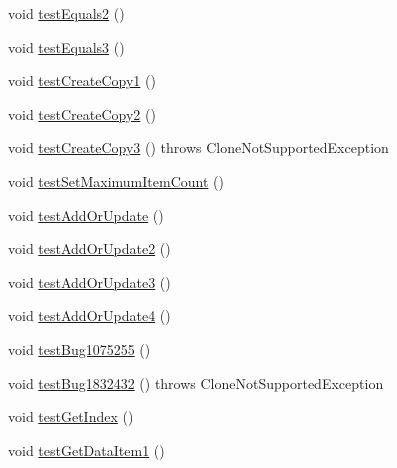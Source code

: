 \begin{DoxyCompactItemize}
\item 
void \mbox{\hyperlink{classorg_1_1jfree_1_1data_1_1time_1_1_time_series_test_a5d8663fc4750d0b53140beab6da7f278}{test\+Equals2}} ()
\item 
void \mbox{\hyperlink{classorg_1_1jfree_1_1data_1_1time_1_1_time_series_test_a5f68bb7f7306731839c2700b5063d85a}{test\+Equals3}} ()
\item 
void \mbox{\hyperlink{classorg_1_1jfree_1_1data_1_1time_1_1_time_series_test_a456b667abc36132f428c31959f532520}{test\+Create\+Copy1}} ()
\item 
void \mbox{\hyperlink{classorg_1_1jfree_1_1data_1_1time_1_1_time_series_test_a39449fadd80fb84600b66980a6824895}{test\+Create\+Copy2}} ()
\item 
void \mbox{\hyperlink{classorg_1_1jfree_1_1data_1_1time_1_1_time_series_test_a842f21aaee9af5b65803a4c9329c9cf7}{test\+Create\+Copy3}} ()  throws Clone\+Not\+Supported\+Exception 
\item 
void \mbox{\hyperlink{classorg_1_1jfree_1_1data_1_1time_1_1_time_series_test_a4a972d98b806952a9d0c8681d1017c29}{test\+Set\+Maximum\+Item\+Count}} ()
\item 
void \mbox{\hyperlink{classorg_1_1jfree_1_1data_1_1time_1_1_time_series_test_ac4f9d9859cf29c2276df2a2e61eea7ff}{test\+Add\+Or\+Update}} ()
\item 
void \mbox{\hyperlink{classorg_1_1jfree_1_1data_1_1time_1_1_time_series_test_a43ec8e21a8c01c4c0cfea8a8bbe55a06}{test\+Add\+Or\+Update2}} ()
\item 
void \mbox{\hyperlink{classorg_1_1jfree_1_1data_1_1time_1_1_time_series_test_a600123557124c6da86477de2b41f5a9e}{test\+Add\+Or\+Update3}} ()
\item 
void \mbox{\hyperlink{classorg_1_1jfree_1_1data_1_1time_1_1_time_series_test_a55a7cb39af7684abe7d04a80899d5217}{test\+Add\+Or\+Update4}} ()
\item 
void \mbox{\hyperlink{classorg_1_1jfree_1_1data_1_1time_1_1_time_series_test_a6378bd20c521a012cf4e49d1a95eaf65}{test\+Bug1075255}} ()
\item 
void \mbox{\hyperlink{classorg_1_1jfree_1_1data_1_1time_1_1_time_series_test_a81ace8dc8dfe4759125734b83e274a87}{test\+Bug1832432}} ()  throws Clone\+Not\+Supported\+Exception 
\item 
void \mbox{\hyperlink{classorg_1_1jfree_1_1data_1_1time_1_1_time_series_test_a4b3110f6d1588e50e8855f8a5f90cdfc}{test\+Get\+Index}} ()
\item 
void \mbox{\hyperlink{classorg_1_1jfree_1_1data_1_1time_1_1_time_series_test_acdb13830c4822956cd8d8a4a7645b696}{test\+Get\+Data\+Item1}} ()

\end{DoxyCompactItemize}
